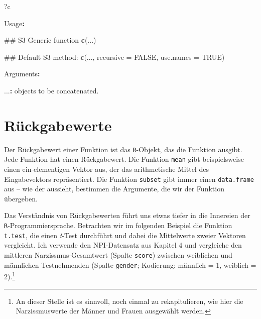 \documentclass[12pt,]{tufte-book}
\newenvironment{Shaded}{\begin{snugshade}}{\end{snugshade}}
\newcommand{\KeywordTok}[1]{\textcolor[rgb]{0.13,0.29,0.53}{\textbf{#1}}}
\newcommand{\DataTypeTok}[1]{\textcolor[rgb]{0.13,0.29,0.53}{#1}}
\newcommand{\DecValTok}[1]{\textcolor[rgb]{0.00,0.00,0.81}{#1}}
\newcommand{\StringTok}[1]{\textcolor[rgb]{0.31,0.60,0.02}{#1}}
\newcommand{\OtherTok}[1]{\textcolor[rgb]{0.56,0.35,0.01}{#1}}
\newcommand{\OperatorTok}[1]{\textcolor[rgb]{0.81,0.36,0.00}{\textbf{#1}}}
\newcommand{\NormalTok}[1]{#1}
\theoremstyle{definition}
\theoremstyle{definition}
\theoremstyle{definition}
\theoremstyle{remark}
\begin{document}
\begin{Shaded}
\begin{Highlighting}[]
\NormalTok{?c}

\NormalTok{Usage}\OperatorTok{:}

\StringTok{     }\NormalTok{## S3 Generic function}
\StringTok{     }\KeywordTok{c}\NormalTok{(...)}
     
\NormalTok{     ## Default S3 method:}
     \KeywordTok{c}\NormalTok{(..., }\DataTypeTok{recursive =} \OtherTok{FALSE}\NormalTok{, }\DataTypeTok{use.names =} \OtherTok{TRUE}\NormalTok{)}
     
\NormalTok{Arguments}\OperatorTok{:}

\StringTok{     }\NormalTok{...}\OperatorTok{:}\StringTok{ }\NormalTok{objects to be concatenated.}
\end{Highlighting}
\end{Shaded}

\section{Rückgabewerte}\label{ruxfcckgabewerte}

Der Rückgabewert einer Funktion ist das \texttt{R}-Objekt, das die
Funktion ausgibt. Jede Funktion hat einen Rückgabewert. Die Funktion
\texttt{mean} gibt beispielsweise einen ein-elementigen Vektor aus, der
das arithmetische Mittel des Eingabevektors repräsentiert. Die Funktion
\texttt{subset} gibt immer einen \texttt{data.frame} aus -- wie der
aussieht, bestimmen die Argumente, die wir der Funktion übergeben.

Das Verständnis von Rückgabewerten führt uns etwas tiefer in die
Innereien der \texttt{R}-Programmiersprache. Betrachten wir im folgenden
Beispiel die Funktion \texttt{t.test}, die einen \emph{t}-Test
durchführt und dabei die Mittelwerte zweier Vektoren vergleicht. Ich
verwende den NPI-Datensatz aus Kapitel 4 und vergleiche den mittleren
Narzissmus-Gesamtwert (Spalte \texttt{score}) zwischen weiblichen und
männlichen Testnehmenden (Spalte \texttt{gender}; Kodierung: männlich =
1, weiblich = 2).\footnote{An dieser Stelle ist es sinnvoll, noch einmal
  zu rekapitulieren, wie hier die Narzissmuswerte der Männer und Frauen
  ausgewählt werden.}

\begin{Shaded}
\end{Shaded}
\end{document}
